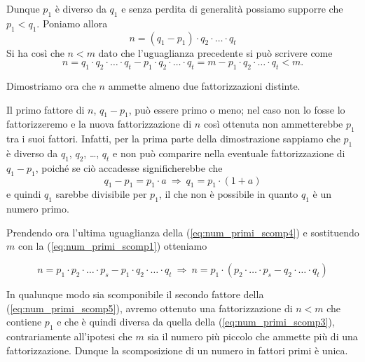 Dunque $p_1$ è diverso da $q_1$ e senza perdita di generalità possiamo supporre che $p_1 < q_1$. Poniamo allora
\begin{equation}\label{eq:num_primi_scomp3}
n = (q_1-p_1)\cdot q_2 \cdot \ldots \cdot q_t
\end{equation}
Si ha così che $n < m$ dato che l'uguaglianza precedente si può scrivere come
\begin{equation}\label{eq:num_primi_scomp4}
n = q_1\cdot q_2\cdot \ldots \cdot q_t - p_1\cdot q_2\cdot \ldots\cdot q_t = m - p_1\cdot q_2\cdot \ldots \cdot q_t < m.
\end{equation}

Dimostriamo ora che $n$ ammette almeno due fattorizzazioni distinte.

Il primo fattore di $n$, $q_1-p_1$, può essere primo o meno; nel caso non lo fosse lo fattorizzeremo e la nuova fattorizzazione di $n$ così ottenuta non ammetterebbe $p_1$ tra i suoi fattori. Infatti, per la prima parte della dimostrazione sappiamo che $p_1$ è diverso da $q_1$, $q_2$, \ldots, $q_t$ e non può comparire nella eventuale fattorizzazione di $q_1-p_1$, poiché se ciò accadesse significherebbe che
\[q_1-p_1= p_1\cdot a \:\Rightarrow\: q_1 = p_1\cdot(1+a)\]
e quindi $q_1$ sarebbe divisibile per $p_1$, il che non è possibile in quanto $q_1$ è un numero primo.

Prendendo ora l'ultima uguaglianza della (\ref{eq:num_primi_scomp4}) e sostituendo $m$ con la (\ref{eq:num_primi_scomp1}) otteniamo

\begin{equation}\label{eq:num_primi_scomp5}
n= p_1 \cdot p_2 \cdot \ldots\cdot p_s-p_1\cdot q_2 \cdot \ldots \cdot q_t \:\Rightarrow\: n = p_1\cdot(p_2\cdot \ldots \cdot p_s- q_2\cdot \ldots\cdot q_t)
\end{equation}

In qualunque modo sia scomponibile il secondo fattore della (\ref{eq:num_primi_scomp5}), avremo ottenuto una fattorizzazione di $n<m$ che contiene $p_1$ e che è quindi diversa da quella della (\ref{eq:num_primi_scomp3}), contrariamente all'ipotesi che $m$ sia il numero più piccolo che ammette più di una fattorizzazione. Dunque la scomposizione di un numero in fattori primi è unica.

